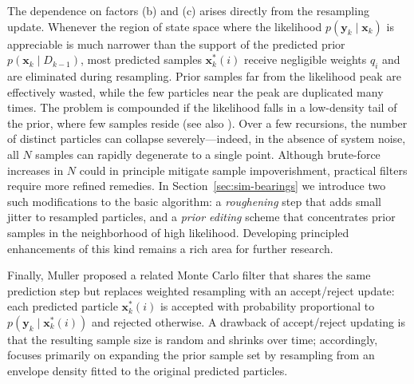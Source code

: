 The dependence on factors (b) and (c) arises directly from the resampling update. Whenever the region of state space where the likelihood $p(\bm{y}_k \mid \bm{x}_k)$ is appreciable is much narrower than the support of the predicted prior $p(\bm{x}_k \mid D_{k-1})$, most predicted samples $\bm{x}_k^*(i)$ receive negligible weights $q_i$ and are eliminated during resampling. Prior samples far from the likelihood peak are effectively wasted, while the few particles near the peak are duplicated many times. The problem is compounded if the likelihood falls in a low-density tail of the prior, where few samples reside (see also \cite{r14}). Over a few recursions, the number of distinct particles can collapse severely—indeed, in the absence of system noise, all $N$ samples can rapidly degenerate to a single point. Although brute-force increases in $N$ could in principle mitigate sample impoverishment, practical filters require more refined remedies. In Section~\ref{sec:sim-bearings} we introduce two such modifications to the basic algorithm: a \emph{roughening} step that adds small jitter to resampled particles, and a \emph{prior editing} scheme that concentrates prior samples in the neighborhood of high likelihood. Developing principled enhancements of this kind remains a rich area for further research.

Finally, Muller \cite{r12} proposed a related Monte Carlo filter that shares the same prediction step but replaces weighted resampling with an accept/reject update: each predicted particle $\bm{x}_k^*(i)$ is accepted with probability proportional to $p(\bm{y}_k \mid \bm{x}_k^*(i))$ and rejected otherwise. A drawback of accept/reject updating is that the resulting sample size is random and shrinks over time; accordingly, \cite{r12} focuses primarily on expanding the prior sample set by resampling from an envelope density fitted to the original predicted particles.

